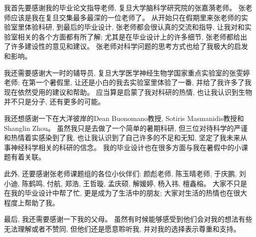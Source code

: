 \documentclass[a4paper, 12pt]{book}
\begin{document}
我首先要感谢我的毕业论文指导老师, 复旦大学脑科学研究院的张嘉漪老师。
张老师应该是我在复旦交集最多最深的一位老师了。
从开始只在假期里来张老师的实验室里体验科研, 到最后的毕业设计,
张老师都会很认真的交流和指导, 让我对和实验室相关的各个方面都有所了解;
尤其是在毕业设计上的许多细节, 张老师都给出了许多建设性的意见和建议。
张老师对科学问题的思考方式也给了我极大的启发和影响。

我还需要感谢大一时的辅导员, 复旦大学医学神经生物学国家重点实验室的张雯婷老师;
在第一个暑假里, 让还是小白的我去实验室里体验了一番,
并给了我许多了我现在依然受用的建议和帮助。
应当算是启蒙了我对科研的热情, 也让我认识到生物并不只是分子, 还有更多的可能。

我还想感谢一下在大洋彼岸的Dean Buonomano教授, Sotiris Masmanidis教授和Shanglin Zhou。
虽然我只是去做了一个简单的暑期科研, 但三位对待科学的严谨和热情着实感染到了我,
也让我认识到了自己许多的不足和无知, 坚定了我未来从事神经科学相关的科研的信念。
我的毕业设计也在很多方面与我在暑假中的小课题有着关联。

此外, 还要感谢张老师课题组的各位小伙伴们: 颜彪老师, 陈玉晴老师, 于庆鹏, 刘小迪,
陈鹤鸣, 付航, 郑浩, 王哲璇, 孟庆硕, 解媛婷, 杨入祎, 檀鑫榕。
大家不只是在我的毕业设计中帮了忙, 更是成为了生活中的朋友;
大家对生活的热情也在很大程度上帮助了我。

最后, 我还需要感谢一下我的父母。
虽然有时候能够感受到他们会对我的想法有些无法理解或者不赞同,
但他们还是愿意聆听我, 并对我的选择表示尊重和支持。

\clearpage
\end{document}

